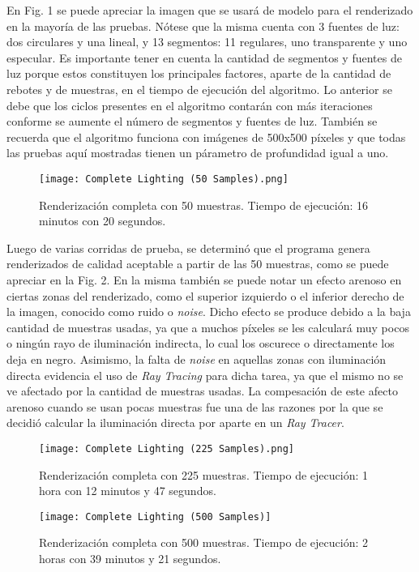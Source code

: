 \documentclass[conference]{IEEEtran}
\begin{document}
En Fig. 1 se puede apreciar la imagen que se usará de modelo para el renderizado en la mayoría de las pruebas. Nótese que la misma cuenta con 3 fuentes de luz: dos circulares y una lineal, y 13 segmentos: 11 regulares, uno transparente y uno especular. Es importante tener en cuenta la cantidad de segmentos y fuentes de luz porque estos constituyen los principales factores, aparte de la cantidad de rebotes y de muestras, en el tiempo de ejecución del algoritmo. Lo anterior se debe que los ciclos presentes en el algoritmo contarán con más iteraciones conforme se aumente el número de segmentos y fuentes de luz. También se recuerda que el algoritmo funciona con imágenes de 500x500 píxeles y que todas las pruebas aquí mostradas tienen un párametro de profundidad igual a uno.

\begin{figure}[htbp]
\centerline{\texttt{[image: Complete Lighting (50 Samples).png]}}
\caption{Renderización completa con 50 muestras. Tiempo de ejecución: 16 minutos con 20 segundos.}
\label{50 muestras completo}
\end{figure}

Luego de varias corridas de prueba, se determinó que el programa genera renderizados de calidad aceptable a partir de las 50 muestras, como se puede apreciar en la Fig. 2. En la misma también se puede notar un efecto arenoso en ciertas zonas del renderizado, como el superior izquierdo o el inferior derecho de la imagen, conocido como ruido o \textit{noise}. Dicho efecto se produce debido a la baja cantidad de muestras usadas, ya que a muchos píxeles se les calculará muy pocos o ningún rayo de iluminación indirecta, lo cual los oscurece o directamente los deja en negro. Asimismo, la falta de \textit{noise} en aquellas zonas con iluminación directa evidencia el uso de \textit{Ray Tracing} para dicha tarea, ya que el mismo no se ve afectado por la cantidad de muestras usadas. La compesación de este afecto arenoso cuando se usan pocas muestras fue una de las razones por la que se decidió calcular la iluminación directa por aparte en un \textit{Ray Tracer}.

\begin{figure}[htbp]
\centerline{\texttt{[image: Complete Lighting (225 Samples).png]}}
\caption{Renderización completa con 225 muestras. Tiempo de ejecución: 1 hora con 12 minutos y 47 segundos.}
\label{225 muestras completo}
\end{figure}

\begin{figure}[htbp]
\centerline{\texttt{[image: Complete Lighting (500 Samples)]}}
\caption{Renderización completa con 500 muestras. Tiempo de ejecución: 2 horas con 39 minutos y 21 segundos.}
\label{500 muestras completo}
\end{figure}
\end{document}
